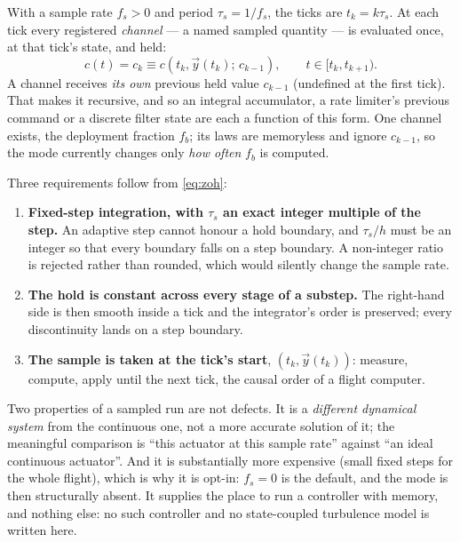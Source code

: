With a sample rate $f_s>0$ and period $\tau_s=1/f_s$, the ticks are $t_k=k\tau_s$. At each tick every
registered \emph{channel} --- a named sampled quantity --- is evaluated once, at that tick's state,
and held:
\begin{equation} \label{eq:zoh}
    c(t) = c_k \equiv c\!\left(t_k,\vec{y}(t_k);\,c_{k-1}\right), \qquad t\in[t_k,t_{k+1}).
\end{equation}
A channel receives \emph{its own} previous held value $c_{k-1}$ (undefined at the first tick). That
makes it recursive, and so an integral accumulator, a rate limiter's previous command or a discrete
filter state are each a function of this form. One channel exists, the deployment fraction $f_b$;
its laws are memoryless and ignore $c_{k-1}$, so the mode currently changes only \emph{how often}
$f_b$ is computed.

Three requirements follow from \autoref{eq:zoh}:
\begin{enumerate}
    \item \textbf{Fixed-step integration, with $\tau_s$ an exact integer multiple of the step.} An
    adaptive step cannot honour a hold boundary, and $\tau_s/h$ must be an integer so that every
    boundary falls on a step boundary. A non-integer ratio is rejected rather than rounded, which
    would silently change the sample rate.
    \item \textbf{The hold is constant across every stage of a substep.} The right-hand side is then
    smooth inside a tick and the integrator's order is preserved; every discontinuity lands on a
    step boundary.
    \item \textbf{The sample is taken at the tick's start}, $(t_k,\vec{y}(t_k))$: measure, compute,
    apply until the next tick, the causal order of a flight computer.
\end{enumerate}
Two properties of a sampled run are not defects. It is a \emph{different dynamical system} from the
continuous one, not a more accurate solution of it; the meaningful comparison is ``this actuator at
this sample rate'' against ``an ideal continuous actuator''. And it is substantially more expensive
(small fixed steps for the whole flight), which is why it is opt-in: $f_s=0$ is the default, and
the mode is then structurally absent. It supplies the place to run a controller with memory, and
nothing else: no such controller and no state-coupled turbulence model is written here.
